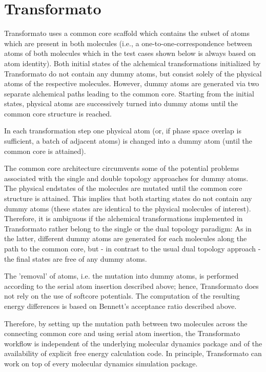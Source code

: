 \chapter{Transformato }

Transformato uses a common core scaffold which contains the subset of atoms which are
present in both molecules (i.e., a one-to-one-correspondence between
atoms of both molecules which in the test cases shown below is always
based on atom identity). Both initial states of the alchemical transformations
initialized by Transformato do not contain any dummy atoms, but consist
solely of the physical atoms of the respective molecules. However,
dummy atoms are generated via two separate alchemical paths leading
to the common core. Starting from the initial states, physical atoms
are successively turned into dummy atoms until the common core structure
is reached. 

In each transformation step one physical atom (or, if phase space
overlap is sufficient, a batch of adjacent atoms) is changed into
a dummy atom (until the common core is attained).

The common core architecture circumvents some of the potential problems
associated with the single and double topology approaches for dummy
atoms. The physical endstates of the molecules are mutated until the
common core structure is attained. This implies that both starting states
do not contain any dummy atoms (these states are identical to the
physical molecules of interest). Therefore, it is ambiguous if the
alchemical transformations implemented in Transformato rather belong
to the single or the dual topology paradigm: As in the latter, different
dummy atoms are generated for each molecules along the path to the
common core, but - in contrast to the usual dual topology approach
- the final states are free of any dummy atoms. 

The 'removal' of atoms, i.e. the mutation into dummy atoms, is performed
according to the serial atom insertion described above; hence, Transformato
does not rely on the use of softcore potentials. The computation
of the resulting energy differences is based on Bennett's acceptance
ratio described above.

Therefore, by setting up the mutation path between two molecules across
the connecting common core and using serial atom
insertion, the Transformato workflow is independent of the underlying
molecular dynamics package and of the availability of explicit free energy
calculation code. In principle, Transformato can work on top of every
molecular dynamics simulation package.

